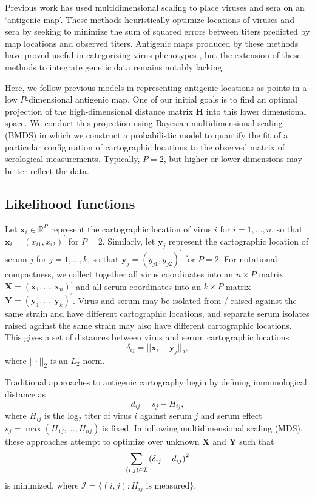 \documentclass[11pt,oneside,letterpaper]{article}
\newcommand{\virus}{\mathbf{x}}						%
\newcommand{\serum}{\mathbf{y}}						%
\newcommand{\viruses}{\mathbf{X}}					%
\newcommand{\sera}{\mathbf{Y}}						%
\newcommand{\se}{s}									%
\newcommand{\vn}{n}									%
\newcommand{\sn}{k}									%
\begin{document}
Previous work \cite{Smith04, Cai10} has used multidimensional scaling to place viruses and sera on an `antigenic map'.  
These methods heuristically optimize locations of viruses and sera by seeking to minimize the sum of squared errors between titers predicted by map locations and observed titers.  
Antigenic maps produced by these methods have proved useful in categorizing virus phenotypes \cite{Smith04}, but the extension of these methods to integrate genetic data remains notably lacking.

Here, we follow previous models in representing antigenic locations as points in a low $P$-dimensional antigenic map. 
One of our initial goals is to find an optimal projection of the high-dimensional distance matrix $\mathbf{H}$ into this lower dimensional space. 
We conduct this projection using Bayesian multidimensional scaling (BMDS) \cite{Oh01} in which we construct a probabilistic model to quantify the fit of a particular configuration of cartographic locations to the observed matrix of serological measurements.
Typically, $P = 2$, but higher or lower dimensions may better reflect the data. 

\subsection*{Likelihood functions}

Let $\virus_i \in \mathbb{R}^{P}$ represent the cartographic location of virus $i$ for $i = 1,\ldots,\vn$, so that $\virus_i = (x_{i1}, x_{i2})^{\prime}$ for $P=2$. 
Similarly, let $\serum_j$ represent the cartographic location of serum $j$ for $j = 1,\ldots,\sn$, so that $\serum_j = (y_{j1},y_{j2})^{\prime}$ for $P=2$.
For notational compactness, we collect together all virus coordinates into an $\vn \times P$ matrix  $\viruses = (\virus_1, \ldots, \virus_{\vn})^{\prime}$ and all serum coordinates into an $\sn \times P$ matrix $\sera = (\serum_{1},\ldots,\serum_{\sn})^{\prime}$.
Virus and serum may be isolated from / raised against the same strain and have different cartographic locations, and separate serum isolates raised against the same strain may also have different cartographic locations. 
This gives a set of distances between virus and serum cartographic locations 
\begin{equation}
	\delta_{ij} =  || \virus_i - \serum_j ||_2,
\end{equation}
where $|| \cdot ||_2$ is an $L_2$ norm.

Traditional approaches to antigenic cartography \cite{Smith04} begin by defining immunological distance as
\begin{equation}
	d_{ij} =  \se_j - H_{ij},
\end{equation}
where $H_{ij}$ is the log$_2$ titer of virus $i$ against serum $j$ and serum effect $\se_j = \max ( H_{1j},\ldots,H_{\vn j} )$ is fixed.
In following multidimensional scaling (MDS), these approaches attempt to optimize over unknown $\viruses$ and $\sera$ such that
\begin{equation}
	\sum_{(i,j) \in \cal I} 
	\left(
		\delta_{ij} - d_{ij}
	\right)^2
\end{equation}
is minimized, where $\mathcal{I} = \{ (i,j) : H_{ij} \mbox{ is measured} \}$.
\end{document}

